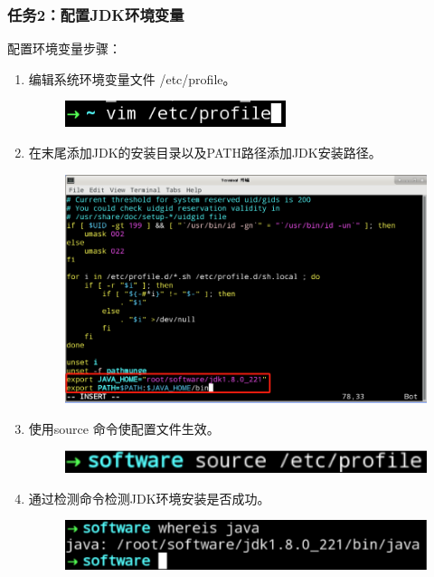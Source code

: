 \documentclass {article}
\begin{document}
			\subsubsection{任务2：配置JDK环境变量}
				配置环境变量步骤：
				\begin{enumerate}
					\item 编辑系统环境变量文件 /etc/profile。
						\begin{figure}[H]
							\centering
							\includegraphics{figures/fig5.png}
						\end{figure}
					
					\item 在末尾添加JDK的安装目录以及PATH路径添加JDK安装路径。
						\begin{figure}[H]
							\centering
							\includegraphics[width=4.5in]{figures/fig6.png}
						\end{figure}
					
					\item 使用source 命令使配置文件生效。
						\begin{figure}[H]
							\centering
							\includegraphics[width=4.5in]{figures/fig7.jpg}
						\end{figure}
					
					\item 通过检测命令检测JDK环境安装是否成功。
						\begin{figure}[H]
							\centering
							\includegraphics[width=4.5in]{figures/fig8.jpg}
						\end{figure}
				\end{enumerate}
			
\end{document}
